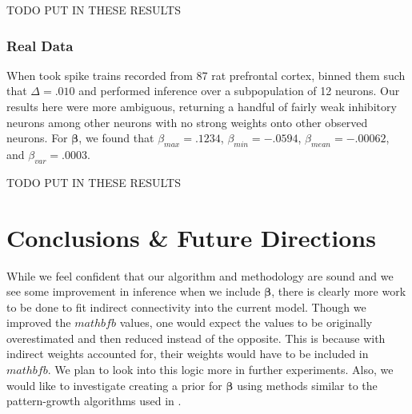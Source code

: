 \documentclass{article}
\begin{document}
TODO PUT IN THESE RESULTS

\subsubsection{Real Data}

When took spike trains recorded from 87 rat prefrontal cortex, binned them such that $\Delta = .010$ and performed inference over a subpopulation of 12 neurons. Our results here were more ambiguous, returning a handful of fairly weak inhibitory neurons among other neurons with no strong weights onto other observed neurons. For  $\bm{\beta}$, we found that $\beta_{max}=.1234$, $\beta_{min}=-.0594$, $\beta_{mean}=-.00062$, and $\beta_{var}=.0003$.

TODO PUT IN THESE RESULTS

\section{Conclusions \& Future Directions}

While we feel confident that our algorithm and methodology are sound and we see some improvement in inference when we include $\bm{\beta}$, there is clearly more work to be done to fit indirect connectivity into the current model. Though we improved the $mathbf{b}$ values, one would expect the values to be originally overestimated and then reduced instead of the opposite. This is because with indirect weights accounted for, their weights would have to be included in $mathbf{b}$. We plan to look into this logic more in further experiments. Also, we would like to investigate creating a prior for $\bm{\beta}$ using methods similar to the pattern-growth algorithms used in \citep{patnaik2011}.



\begin{small}

 
\end{small}
\end{document}
